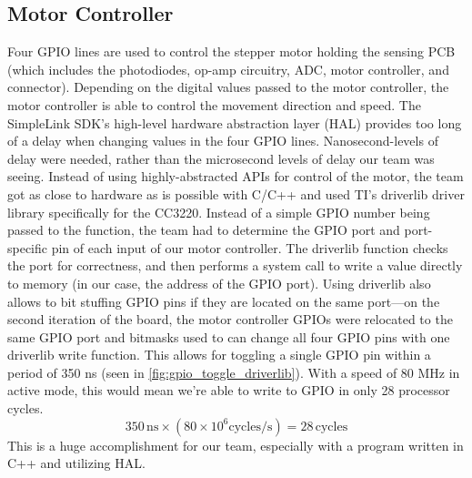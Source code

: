 \documentclass[journal]{IEEEtran}
\begin{document}
\subsection{Motor Controller}
Four GPIO lines are used to control the stepper motor holding the sensing PCB (which includes 
the photodiodes, op-amp circuitry, ADC, motor controller, and connector). Depending on the 
digital values passed to the motor controller, the motor controller is able to control the 
movement direction and speed. The SimpleLink SDK's high-level hardware abstraction layer (HAL) provides 
too long of a delay when changing values in the four GPIO lines. Nanosecond-levels of delay 
were needed, rather than the microsecond levels of delay our team was seeing. Instead of 
using highly-abstracted APIs for control of the motor, the team got as close to hardware as is possible 
with C/C++ and used TI's driverlib driver library specifically for the CC3220. Instead of a simple 
GPIO number being passed to the function, the team had to determine the GPIO port and port-specific 
pin of each input of our motor controller. The driverlib function checks the port for correctness, 
and then performs a system call to write a value directly to memory (in our case, the address of the 
GPIO port). Using driverlib also allows to bit stuffing GPIO pins if they are located on the same 
port---on the second iteration of the board, the motor controller GPIOs were relocated to the same GPIO port 
and bitmasks used to can change all four GPIO pins with one driverlib write function. This allows for toggling a 
single GPIO pin within a period of 350 ns (seen in \ref{fig:gpio_toggle_driverlib}). With a speed of 80 MHz in 
active mode, this would mean we're able to write to GPIO in only 28 processor cycles.
\begin{equation}
	350\,\mathrm{ns} \times (80\times10^6\mathrm{cycles/s}) = 28\,\mathrm{cycles}
\end{equation}
This is a huge accomplishment for our team, especially with a program written in C++ and utilizing HAL.
\end{document}
